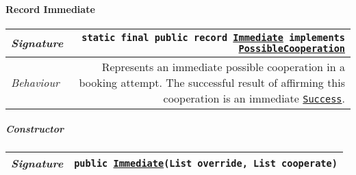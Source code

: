 \begin{adjustwidth}{1.5em}{0pt}
\begin{adjustwidth}{1.5em}{0pt}
\begin{adjustwidth}{1.5em}{0pt}
\begin{adjustwidth}{1.5em}{0pt}
\begin{adjustwidth}{1.5em}{0pt}
{\begin{tabularx}{1.0\linewidth}{@{}l R@{}}
          \end{tabularx}}
        \end{adjustwidth}
      \end{adjustwidth}\paragraph{Record Immediate\label{edu.kit.hci.soli.dto.BookingAttemptResult.PossibleCooperation.Immediate} }
      \begin{adjustwidth}{1.5em}{0pt}
        {\begin{tabularx}{1.0\linewidth}{@{}l R@{}}
          \emph{Signature} & \texttt{static final public  record \texttt{\hyperref[edu.kit.hci.soli.dto.BookingAttemptResult.PossibleCooperation.Immediate]{\texttt{Immediate}} implements \texttt{\hyperref[edu.kit.hci.soli.dto.BookingAttemptResult.PossibleCooperation]{\texttt{PossibleCooperation}}}}} \\
          \hline
          \emph{Behaviour} & Represents an immediate possible cooperation in a booking attempt. The successful result of affirming this cooperation is an immediate  \texttt{\hyperref[edu.kit.hci.soli.dto.BookingAttemptResult.Success]{\texttt{Success}}}.  \\
          \hline
  
        \end{tabularx}}\subparagraph{Constructor\label{edu.kit.hci.soli.dto.BookingAttemptResult.PossibleCooperation.Immediate@edu.kit.hci.soli.dto.BookingAttemptResult.PossibleCooperation.Immediate(java.util.List,java.util.List)}}
        \begin{adjustwidth}{1.5em}{0pt}
          {\begin{tabularx}{1.0\linewidth}{@{}l R@{}}
            \emph{Signature} & \texttt{public \texttt{\hyperref[edu.kit.hci.soli.dto.BookingAttemptResult.PossibleCooperation.Immediate]{\texttt{Immediate}}}(\texttt{List} override, \texttt{List} cooperate)} \\
            \hline
  

\end{tabularx}}
\end{adjustwidth}
\end{adjustwidth}
\end{adjustwidth}
\end{adjustwidth}
\end{adjustwidth}
